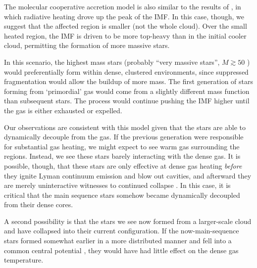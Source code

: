 \documentclass{emulateapj}
\begin{document}

The molecular cooperative accretion model is also similar to the results of
\citet{Krumholz2011a}, in which radiative heating drove up the peak of the IMF.
In this case, though, we suggest that the affected region is smaller (not the
whole cloud).  Over the small heated region, the IMF is driven to be more
top-heavy than in the initial cooler cloud, permitting the formation of more
massive stars.

In this scenario, the highest mass stars (probably ``very massive stars'',
$M\gtrsim50$ \msun) would preferentially form within dense, clustered
environments, since suppressed fragmentation would allow the buildup of
more mass.  The first generation of stars forming from `primordial' gas
would come from a slightly different mass function than subsequent stars.  The
process would continue pushing the IMF higher until the gas is either exhausted
\citep{Kruijssen2012b,Ginsburg2016b} or expelled.

Our observations are consistent with this model given that the stars are able
to dynamically decouple from the gas.  If the previous generation were
responsible for substantial gas heating, we might expect to see warm gas
surrounding the \hchii regions.  Instead, we see these stars barely interacting
with the dense gas.  It is possible, though, that these stars are only
effective at dense gas heating \emph{before} they ignite Lyman continuum
emission and blow out cavities, and afterward they are merely uninteractive
witnesses to continued collapse \citep{Peters2010c}.  In this case, it is
critical that the main sequence stars somehow became dynamically decoupled from
their dense cores.


A second possibility is that the stars we see now formed from a larger-scale
cloud and have collapsed into their current configuration.  If the
now-main-sequence stars formed somewhat earlier in a more distributed manner
and fell into a common central potential \citep[e.g., the `conveyor belt'
scenario for cluster formation,][]{Ginsburg2012a,Longmore2014a,Walker2016a},
they would have had little effect on the dense gas temperature.
\end{document}
